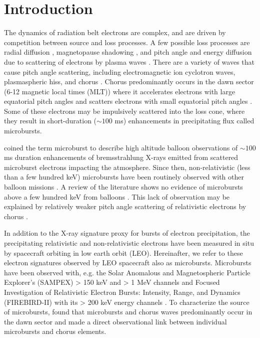 \documentclass[draft, linenumbers]{agujournal}
\begin{document}
\section{Introduction}\label{Intro}
The dynamics of radiation belt electrons are complex, and are driven by competition between source and loss processes. A few possible loss processes are radial diffusion \citep{Shprits2004}, magnetopause shadowing \citep{Ukhorskiy2006}, and pitch angle and energy diffusion due to scattering of electrons by plasma waves \citep[e.g.][]{Abel1998_1, Summers1998, Meredith2002, Selesnick2003, Horne2003, Thorne2005, Mozer2018}. There are a variety of waves that cause pitch angle scattering, including electromagnetic ion cyclotron waves, plasmaspheric hiss, and chorus \citep{Millan2007, Thorne2010}. Chorus predominantly occurs in the dawn sector (6-12 magnetic local times (MLT)) \citep{Li2009} where it accelerates electrons with large equatorial pitch angles and scatters electrons with small equatorial pitch angles \citep{Horne2003}. Some of these electrons may be impulsively scattered into the loss cone, where they result in short-duration ($\sim 100$ ms) enhancements in precipitating flux called microbursts.

\citet{Anderson1964} coined the term microburst to describe high altitude balloon observations of $\sim 100$ ms duration enhancements of bremsstrahlung X-rays emitted from scattered microburst electrons impacting the atmosphere. Since then, non-relativistic (less than a few hundred keV) microbursts have been routinely observed with other balloon missions \citep[e.g.][]{Parks1967, Woodger2015, Anderson2017}. A review of the literature shows no evidence of microbursts above a few hundred keV from balloons \citep{Millan2002, Woodger2015}. This lack of observation may be explained by relatively weaker pitch angle scattering of relativistic electrons by chorus \citep{Lee2012}. 

In addition to the X-ray signature proxy for bursts of electron precipitation, the precipitating relativistic and non-relativistic electrons have been measured in situ by spacecraft orbiting in low earth orbit (LEO). Hereinafter, we refer to these electron signatures observed by LEO spacecraft also as microbursts. Microbursts have been observed with, e.g. the Solar Anomalous and Magnetospheric Particle Explorer's (SAMPEX) > 150 keV and > 1 MeV channels \citep{Nakamura1995, Nakamura2000, Blake1996, Lorentzen2001a, Lorentzen2001b, O'Brien2003, O'Brien2004, Blum2015} and Focused Investigation of Relativistic Electron Bursts: Intensity, Range, and Dynamics (FIREBIRD-II) with its > 200 keV energy channels \citep{Crew2016, Anderson2017, Breneman2017}. To characterize the source of microbursts, \citet{Lorentzen2001b} found that microbursts and chorus waves predominantly occur in the dawn sector and \citet{Breneman2017} made a direct observational link between individual microbursts and chorus elements.
\end{document}
